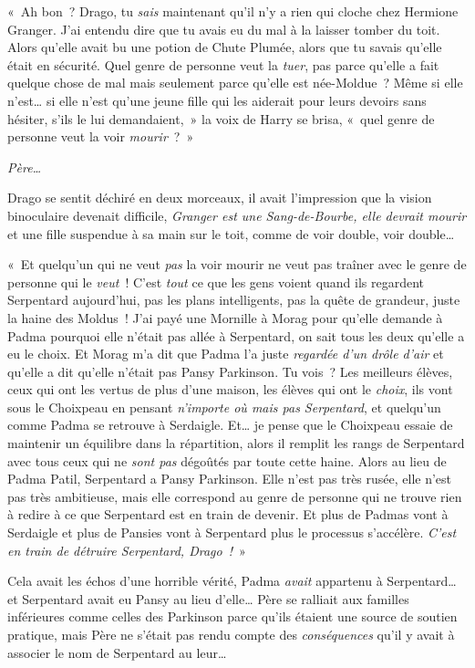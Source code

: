 «~Ah bon~?
Drago, tu \emph{sais} maintenant qu'il n'y a rien qui cloche chez Hermione Granger.
J'ai entendu dire que tu avais eu du mal à la laisser tomber du toit.
Alors qu'elle avait bu une potion de Chute Plumée, alors que tu savais qu'elle était en sécurité.
Quel genre de personne veut la \emph{tuer}, pas parce qu'elle a fait quelque chose de mal mais seulement parce qu'elle est née-Moldue~?
Même si elle n'est… si elle n'est qu'une jeune fille qui les aiderait pour leurs devoirs sans hésiter, s'ils le lui demandaient,~» la voix de Harry se brisa, «~quel genre de personne veut la voir \emph{mourir}~?~»

\emph{Père…}

Drago se sentit déchiré en deux morceaux, il avait l'impression que la vision binoculaire devenait difficile, \emph{Granger est une Sang-de-Bourbe, elle devrait mourir} et une fille suspendue à sa main sur le toit, comme de voir double, voir double…

«~Et quelqu'un qui ne veut \emph{pas} la voir mourir ne veut pas traîner avec le genre de personne qui le \emph{veut}~!
C'est \emph{tout} ce que les gens voient quand ils regardent Serpentard aujourd'hui, pas les plans intelligents, pas la quête de grandeur, juste la haine des Moldus~!
J'ai payé une Mornille à Morag pour qu'elle demande à Padma pourquoi elle n'était pas allée à Serpentard, on sait tous les deux qu'elle a eu le choix.
Et Morag m'a dit que Padma l'a juste \emph{regardée d'un drôle d'air} et qu'elle a dit qu'elle n'était pas Pansy Parkinson.
Tu vois~?
Les meilleurs élèves, ceux qui ont les vertus de plus d'une maison, les élèves qui ont le \emph{choix}, ils vont sous le Choixpeau en pensant \emph{n'importe où mais pas Serpentard}, et quelqu'un comme Padma se retrouve à Serdaigle.
Et… je pense que le Choixpeau essaie de maintenir un équilibre dans la répartition, alors il remplit les rangs de Serpentard avec tous ceux qui ne \emph{sont pas} dégoûtés par toute cette haine.
Alors au lieu de Padma Patil, Serpentard a Pansy Parkinson.
Elle n'est pas très rusée, elle n'est pas très ambitieuse, mais elle correspond au genre de personne qui ne trouve rien à redire à ce que Serpentard est en train de devenir.
Et plus de Padmas vont à Serdaigle et plus de Pansies vont à Serpentard plus le processus s'accélère.
\emph{C'est en train de détruire Serpentard, Drago~!}~»

Cela avait les échos d'une horrible vérité, Padma \emph{avait} appartenu à Serpentard… et Serpentard avait eu Pansy au lieu d'elle…
Père se ralliait aux familles inférieures comme celles des Parkinson parce qu'ils étaient une source de soutien pratique, mais Père ne s'était pas rendu compte des \emph{conséquences} qu'il y avait à associer le nom de Serpentard au leur…

